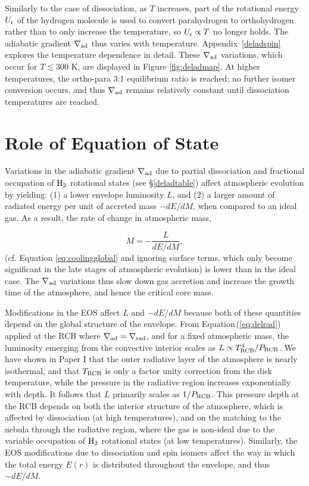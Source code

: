 \documentclass[apj]{emulateapj}
\newcommand{\delad}{\nabla_{\rm ad}}
\newcommand{\delrad}{\nabla_{\rm rad}}
\newcommand{\Eq}[1]{Equation\,(\ref{#1})}
\newcommand{\App}[1]{Appendix~\ref{#1}}
\newcommand{\cb}{_{\rm RCB}}
\begin{document}

Similarly to the case of dissociation, as $T$ increases, part of the rotational energy $U_{\rm r}$ of the hydrogen molecule is used to convert parahydrogen to orthohydrogen rather than to only increase the temperature, so $U_{\rm r} \propto T$ no longer holds. The adiabatic gradient $\delad$ thus varies with temperature. \App{deladspin} explores the temperature dependence in detail. These $\delad$ variations, which occur for $T \lesssim 300$ K, are displayed in Figure \ref{fig:deladmap}. At higher temperatures, the ortho-para 3:1 equilibrium ratio is reached; no further isomer conversion occurs, and thus $\delad$ remains relatively constant until dissociation temperatures are reached. 



\section{Role of Equation of State}
\label{EOSeffects}

Variations in the adiabatic gradient $\delad$ due to partial dissociation and fractional occupation of $\rm{H}_2$ rotational states (see \S\ref{deladtable}) affect atmospheric evolution by yielding: (1) a lower envelope luminosity $L$, and (2) a larger amount of radiated energy per unit of accreted mass $-dE/dM$, when compared to an ideal gas. As a result, the rate of change in atmospheric mass,

\begin{equation}
\label{eq:dMdt}
\dot{M} = -\frac{L}{dE/dM},
\end{equation}
(cf. Equation \ref{eq:coolingglobal} and ignoring surface terms, which only become significant in the late stages of atmospheric evolution) is lower than in the ideal case. The $\delad$ variations thus slow down gas accretion and increase the growth time of the atmosphere, and hence the critical core mass.  

Modifications in the EOS affect $L$ and $-dE/dM$ because both of these quantities depend on the global structure of the envelope. From \Eq{eq:delrad} applied at the RCB where $\delad=\delrad$, and for a fixed atmospheric mass, the luminosity emerging from the convective interior scales as $L \propto T\cb^4/P\cb$. We have shown in Paper I that the outer radiative layer of the atmosphere is nearly isothermal, and that $T\cb$ is only a factor unity correction from the disk temperature, while the pressure in the radiative region increases exponentially with depth. It follows that $L$ primarily scales as $1/P\cb$. This pressure depth at the RCB depends on both the interior structure of the atmosphere, which is affected by dissociation (at high temperatures), and on the matching to the nebula through the radiative region, where the gas is non-ideal due to the variable occupation of $\rm{H}_2$ rotational states (at low temperatures). Similarly, the EOS modifications due to dissociation and spin isomers affect the way in which the total energy $E(r)$ is distributed throughout the envelope, and thus $-dE/dM$.
\end{document}
